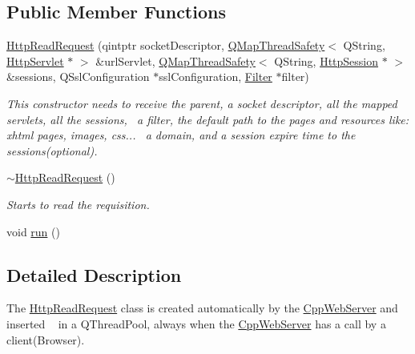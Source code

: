 \subsection*{Public Member Functions}
\begin{DoxyCompactItemize}
\item 
\hyperlink{class_c_w_f_1_1_http_read_request_ade7aa5ac198bb40ce98de9f9ac9ff4d2}{Http\+Read\+Request} (qintptr socket\+Descriptor, \hyperlink{class_c_w_f_1_1_q_map_thread_safety}{Q\+Map\+Thread\+Safety}$<$ Q\+String, \hyperlink{class_c_w_f_1_1_http_servlet}{Http\+Servlet} $\ast$ $>$ \&url\+Servlet, \hyperlink{class_c_w_f_1_1_q_map_thread_safety}{Q\+Map\+Thread\+Safety}$<$ Q\+String, \hyperlink{class_c_w_f_1_1_http_session}{Http\+Session} $\ast$ $>$ \&sessions, Q\+Ssl\+Configuration $\ast$ssl\+Configuration, \hyperlink{class_c_w_f_1_1_filter}{Filter} $\ast$filter)
\begin{DoxyCompactList}\small\item\em This constructor needs to receive the parent, a socket descriptor, all the mapped servlets, all the sessions,~\newline
 a filter, the default path to the pages and resources like\+: xhtml pages, images, css...~\newline
 a domain, and a session expire time to the sessions(optional). \end{DoxyCompactList}\item 
\hyperlink{class_c_w_f_1_1_http_read_request_ad2013577721f188ab3e94c9b977fe3ee}{$\sim$\+Http\+Read\+Request} ()
\begin{DoxyCompactList}\small\item\em Starts to read the requisition. \end{DoxyCompactList}\item 
void \hyperlink{class_c_w_f_1_1_http_read_request_a45c1183b9857a34d4a53452917f7bcec}{run} ()
\end{DoxyCompactItemize}


\subsection{Detailed Description}
The \hyperlink{class_c_w_f_1_1_http_read_request}{Http\+Read\+Request} class is created automatically by the \hyperlink{class_c_w_f_1_1_cpp_web_server}{Cpp\+Web\+Server} and inserted ~\newline
 in a Q\+Thread\+Pool, always when the \hyperlink{class_c_w_f_1_1_cpp_web_server}{Cpp\+Web\+Server} has a call by a client(\+Browser). 

